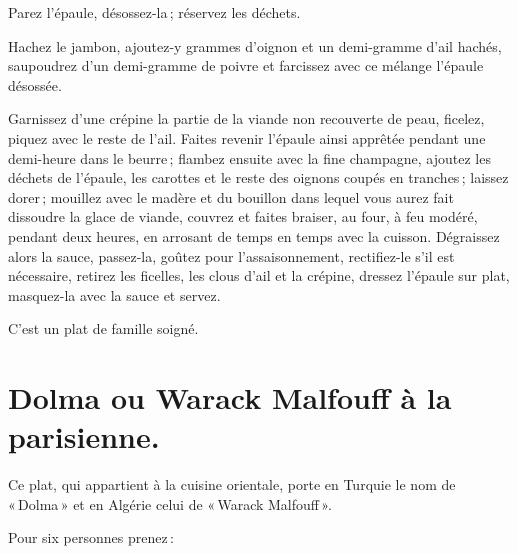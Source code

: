Parez l'épaule, désossez-la ; réservez les déchets.

Hachez le jambon, ajoutez-y {\mmm} grammes d’oignon et un demi-gramme
d'ail hachés, saupoudrez d'un demi-gramme de poivre et farcissez avec ce
mélange l'épaule désossée.

Garnissez d'une crépine la partie de la viande non recouverte de peau, ficelez,
piquez avec le reste de l'ail. Faites revenir l'épaule ainsi apprêtée pendant
une demi-heure dans le beurre ; flambez ensuite avec la fine champagne, ajoutez
les déchets de l'épaule, les carottes et le reste des oignons coupés en
tranches ; laissez dorer ; mouillez avec le madère et du bouillon dans lequel
vous aurez fait dissoudre la glace de viande, couvrez et faites braiser, au
four, à feu modéré, pendant deux heures, en arrosant de temps en temps avec la
cuisson. Dégraissez alors la sauce, passez-la, goûtez pour l’assaisonnement,
rectifiez-le s'il est nécessaire, retirez les ficelles, les clous d'ail et la
crépine, dressez l'épaule sur plat, masquez-la avec la sauce et servez.

C'est un plat de famille soigné.

\section*{\centering Dolma ou Warack Malfouff à la parisienne.}
{}

Ce plat, qui appartient à la cuisine orientale, porte en Turquie le nom de
« Dolma » et en Algérie celui de « Warack Malfouff ».

Pour six personnes prenez :

\medskip

